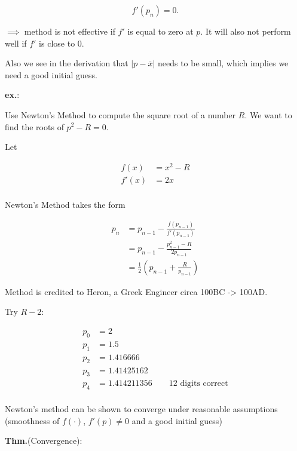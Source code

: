 \documentclass[12pt]{article}
\newcommand{\thm}{\textbf{Thm.}\xspace}
\newcommand{\ex}{\textbf{ex.}\xspace}
\begin{document}
\[
f'(p_n) = 0
.\]
 
$\implies$ method is not effective if $f'$ is equal to zero at $p$. It will
also not perform well if $f'$ is close to $0$.

Also we see in the derivation that $|p- \overline{x}|$ needs to be small,
which implies we need a good initial guess.

\ex:

Use Newton's Method to compute the square root of a number $R$. We want to find
the roots of $p^2 - R = 0$. 

Let

\begin{align*}
  f(x) &= x^2 - R \\
  f'(x) &= 2x \\
\end{align*}

Newton's Method takes the form

\begin{align*}
p_n &= p_{n-1} - \frac{f(p_{n-1})}{f'(p_{n-1})} \\
    &= p_{n-1} - \frac{p_{n-1}^2 - R}{2p_{n-1}} \\
    &= \frac{1}{2}(p_{n-1} + \frac{R}{p_{n-1}})
\end{align*}

Method is credited to Heron, a Greek Engineer circa 100BC -> 100AD.

Try $R-2$: 

\begin{align*}
p_0 &= 2 \\
p_1 &= 1.5 \\
p_2 &= 1.416666 \\
p_3 &= 1.41425162 \\
p_4 &= 1.414211356 \qquad \text{12 digits correct}  \\
\end{align*}

Newton's method can be shown to converge under reasonable assumptions
(smoothness of $f(\cdot)$, $f'(p)\neq 0$ and a good initial guess)

\thm (Convergence):
\end{document}
